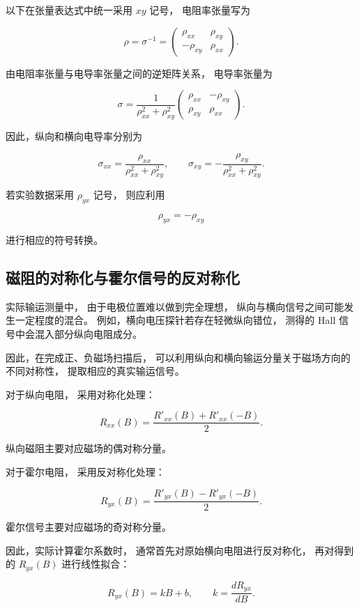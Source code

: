 \documentclass[openany]{book}
\theoremstyle{mydefinition}
\theoremstyle{myplain}
\begin{document}
以下在张量表达式中统一采用 \(xy\) 记号，
电阻率张量写为

\[
\rho
=
\sigma^{-1}
=
\begin{pmatrix}
\rho_{xx} & \rho_{xy} \\
-\rho_{xy} & \rho_{xx}
\end{pmatrix}.
\]

由电阻率张量与电导率张量之间的逆矩阵关系，
电导率张量为

\[
\sigma
=
\frac{1}
{\rho_{xx}^{2}+\rho_{xy}^{2}}
\begin{pmatrix}
\rho_{xx} & -\rho_{xy} \\
\rho_{xy} & \rho_{xx}
\end{pmatrix}.
\]

因此，纵向和横向电导率分别为

\[
\sigma_{xx}
=
\frac{\rho_{xx}}
{\rho_{xx}^{2}+\rho_{xy}^{2}},
\qquad
\sigma_{xy}
=
-\frac{\rho_{xy}}
{\rho_{xx}^{2}+\rho_{xy}^{2}}.
\]

若实验数据采用 \(\rho_{yx}\) 记号，
则应利用

\[
\rho_{yx}
=
-\rho_{xy}
\]

进行相应的符号转换。


\subsection{磁阻的对称化与霍尔信号的反对称化}

实际输运测量中，
由于电极位置难以做到完全理想，
纵向与横向信号之间可能发生一定程度的混合。
例如，横向电压探针若存在轻微纵向错位，
测得的 Hall 信号中会混入部分纵向电阻成分。

因此，在完成正、负磁场扫描后，
可以利用纵向和横向输运分量关于磁场方向的不同对称性，
提取相应的真实输运信号。

对于纵向电阻，
采用对称化处理：

\[
R_{xx}(B)
=
\frac{
R'_{xx}(B)+R'_{xx}(-B)
}{2}.
\]

纵向磁阻主要对应磁场的偶对称分量。

对于霍尔电阻，
采用反对称化处理：

\[
R_{yx}(B)
=
\frac{
R'_{yx}(B)-R'_{yx}(-B)
}{2}.
\]

霍尔信号主要对应磁场的奇对称分量。

因此，实际计算霍尔系数时，
通常首先对原始横向电阻进行反对称化，
再对得到的 \(R_{yx}(B)\) 进行线性拟合：

\[
R_{yx}(B)
=
kB+b,
\qquad
k=\frac{dR_{yx}}{dB}.
\]
\end{document}
